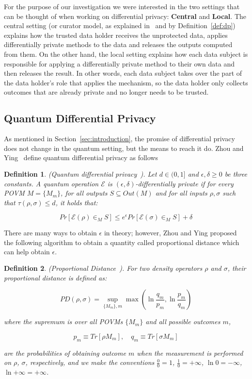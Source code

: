 \documentclass{ieeeaccess}
\newtheorem{definition}{Definition}[section]
\begin{document}
For the purpose of our investigation we were interested in the two settings that can be thought of when working on differential privacy: \textbf{Central} and \textbf{Local}. The central setting (or curator model, as explained in~\cite{dwork2014algorithmic} and by Definition~\ref{def:dp}) explains how the trusted data holder receives the unprotected data, applies differentially private methods to the data and releases the outputs computed from them. On the other hand, the local setting explains how each data subject is responsible for applying a differentially private method to their own data and then releases the result. In other words, each data subject takes over the part of the data holder's role that applies the mechanism, so the data holder only collects outcomes that are already private and no longer needs to be trusted.


\subsection{Quantum Differential Privacy}

As mentioned in Section~\ref{sec:introduction}, the promise of differential privacy does not change in the quantum setting, but the means to reach it do. Zhou and Ying~\cite{zhou2017differential} define quantum differential privacy as follows

\begin{definition}
  (Quantum differential privacy~\cite{zhou2017differential}). Let $d \in (0,1]$ and $\epsilon,\delta \geq 0$ be three constants. A quantum operation $\mathcal{E}$ is $(\epsilon, \delta)$-differentially private if for every POVM $M = \{M_m\}$, for all outputs $S \subseteq Out(M)$ and for all inputs $\rho, \sigma$ such that $\tau(\rho, \sigma)\leq d$, it holds that:

  \[
    Pr[\mathcal{E}(\rho)\in_{M}S] \leq e^{\epsilon} Pr[\mathcal{E}(\sigma)\in_{M}S] + \delta
  \]
  \label{def:qdp}
\end{definition}

There are many ways to obtain $\epsilon$ in theory; however, Zhou and Ying proposed the following algorithm to obtain a quantity called proportional distance which can help obtain $\epsilon$.

\begin{definition}
  (Proportional Distance~\cite{zhou2017differential}). For two density operators $\rho$ and $\sigma$, their proportional distance is defined as:

  \[
    PD(\rho, \sigma) = \sup_{\{M_m\}, m} \max\left(\ln\frac{q_m}{p_m}, \ln\frac{p_m}{q_m}\right)
  \]

  where the supremum is over all POVMs $\{M_m\}$ and all possible outcomes $m$,

  \[
    p_m \equiv Tr[\rho M_m], \quad q_m \equiv Tr[\sigma M_m]
  \]

  are the probabilities of obtaining outcome $m$ when the measurement is performed on $\rho$, $\sigma$, respectively, and we make the conventions $\frac{0}{0} = 1$, $\frac{1}{0} = +\infty$, $\ln 0 = -\infty$, $\ln{+\infty} = +\infty$.
  \label{def:proportional_distance}
\end{definition}
\end{document}
